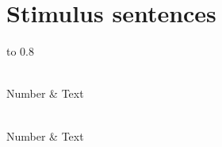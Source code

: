 \chapter{Stimulus sentences\label{apx:HarvardSents}}

\begin{longtabu} to 0.8\textwidth [c]{X[c] X[4]}
	\caption[\ac{ieee} “Harvard” sentences used as stimuli]{\ac{ieee} “Harvard” sentences used as stimuli. Here “number” combines the “list” and “sentence” numbers from the original numeration given in \citet{HarvardSents}\label{tab:HarvardSents}}\\
	\toprule
	\rowfont[c]{\bfseries} Number & Text \\
	\midrule
	\endfirsthead

	\caption[]{\ac{ieee} “Harvard” sentences used as stimuli {\itshape (continued from previous page)}}\\
	\midrule
	\rowfont[c]{\bfseries} Number & Text \\
	\midrule
	\endhead
	
	\midrule 
	 \\
	\endfoot
	
	\bottomrule
	\endlastfoot


\end{longtabu}
